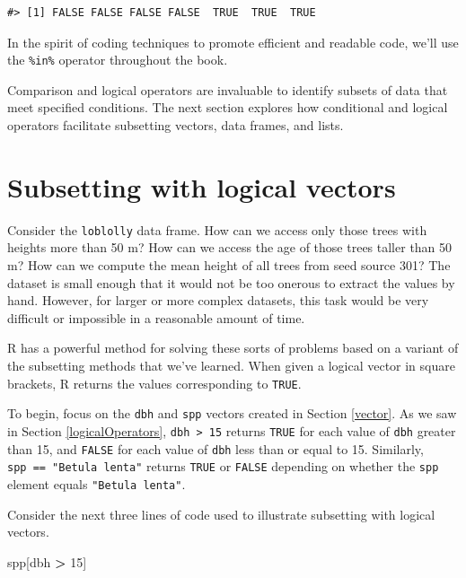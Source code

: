 \documentclass[
  11pt,
]{krantz}
\newenvironment{Shaded}{\begin{snugshade}}{\end{snugshade}}
\newcommand{\DecValTok}[1]{\textcolor[rgb]{0.00,0.00,0.81}{#1}}
\newcommand{\NormalTok}[1]{#1}
\newcommand{\OperatorTok}[1]{\textcolor[rgb]{0.81,0.36,0.00}{\textbf{#1}}}
\newcommand{\StringTok}[1]{\textcolor[rgb]{0.31,0.60,0.02}{#1}}
\theoremstyle{definition}
\theoremstyle{definition}
\theoremstyle{definition}
\theoremstyle{definition}
\theoremstyle{remark}
\begin{document}
\begin{verbatim}
#> [1] FALSE FALSE FALSE FALSE  TRUE  TRUE  TRUE
\end{verbatim}

In the spirit of coding techniques to promote efficient and readable code, we'll use the \texttt{\%in\%} operator throughout the book.

Comparison and logical operators are invaluable to identify subsets of data that meet specified conditions. The next section explores how conditional and logical operators facilitate subsetting vectors, data frames, and lists.

\hypertarget{subsetting}{%
\section{Subsetting with logical vectors}\label{subsetting}}

Consider the \texttt{loblolly} data frame. How can we access only those trees with heights more than 50 m? How can we access the age of those trees taller than 50 m? How can we compute the mean height of all trees from seed source 301? The dataset is small enough that it would not be too onerous to extract the values by hand. However, for larger or more complex datasets, this task would be very difficult or impossible in a reasonable amount of time.

R has a powerful method for solving these sorts of problems based on a variant of the subsetting methods that we've learned. When given a logical vector in square brackets, R returns the values corresponding to \texttt{TRUE}.

To begin, focus on the \texttt{dbh} and \texttt{spp} vectors created in Section \ref{vector}. As we saw in Section \ref{logicalOperators}, \texttt{dbh\ \textgreater{}\ 15} returns \texttt{TRUE} for each value of \texttt{dbh} greater than 15, and \texttt{FALSE} for each value of \texttt{dbh} less than or equal to 15. Similarly, \texttt{spp\ ==\ "Betula\ lenta"} returns \texttt{TRUE} or \texttt{FALSE} depending on whether the \texttt{spp} element equals \texttt{"Betula\ lenta"}.

Consider the next three lines of code used to illustrate subsetting with logical vectors.

\begin{Shaded}
\begin{Highlighting}[]
\NormalTok{spp[dbh }\OperatorTok{\textgreater{}}\StringTok{ }\DecValTok{15}\NormalTok{]}
\end{Highlighting}
\end{Shaded}
\end{document}
